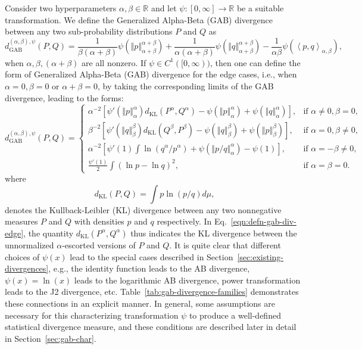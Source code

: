 \documentclass[11pt]{article}
\theoremstyle{plain}
\theoremstyle{remark}
\def\R{\mathbb{R}}
\newcommand{\dKL}{d_{\mathrm{KL}}}
\newcommand{\dGAB}{d_{\mathrm{GAB}}}
\newcommand{\norm}[1]{\left\Vert #1 \right\Vert}
\newcommand{\inner}[1]{\left\langle #1\right\rangle}
\begin{document}
Consider two hyperparameters $\alpha, \beta \in \R$ and let $\psi: [0, \infty] \rightarrow \R$ be a suitable transformation. We define the Generalized Alpha-Beta (GAB) divergence between any two sub-probability distributions $P$ and $Q$ as
\begin{equation}
    \dGAB^{(\alpha,\beta),\psi}(P, Q)
    = \dfrac{1}{\beta(\alpha+\beta)} \psi\left( \norm{p}_{\alpha+\beta}^{\alpha+\beta} \right)
    + \dfrac{1}{\alpha(\alpha+\beta)} \psi\left( \norm{q}_{\alpha+\beta}^{\alpha+\beta} \right)
    - \dfrac{1}{\alpha\beta} \psi\left( \inner{p,q}_{\alpha,\beta} \right),
    \label{eqn:defn-gab-div}
\end{equation}
\noindent when $\alpha, \beta, (\alpha+\beta)$ are all nonzero. If $\psi \in C^1([0,\infty))$, then one can define the form of Generalized Alpha-Beta (GAB) divergence for the edge cases, i.e., when $\alpha = 0, \beta = 0$ or $\alpha + \beta = 0$, by taking the corresponding limits of the GAB divergence, leading to the forms:
\begin{equation}
    \dGAB^{(\alpha,\beta),\psi}(P, Q)
    = \begin{cases}
        \alpha^{-2}\left[ \psi'(\norm{p}_{\alpha}^{\alpha}) \dKL(P^\alpha,Q^\alpha) - \psi(\norm{p}_\alpha^\alpha) + \psi(\norm{q}_\alpha^\alpha)\right], & \text{if } \alpha \neq 0, \beta = 0, \\
        \beta^{-2} \left[\psi'(\norm{q}_{\beta}^{\beta}) \dKL(Q^\beta, P^\beta) - \psi(\norm{q}_\beta^\beta) + \psi(\norm{p}_\beta^\beta)\right],         & \text{if } \alpha = 0, \beta \neq 0, \\
        \alpha^{-2}\left[ \psi'(1) \int \ln(q^\alpha/p^\alpha) + \psi\left( \norm{p/q}_\alpha^{\alpha} \right) - \psi(1) \right],                         & \text{if } \alpha = -\beta \neq 0,   \\
        \frac{\psi'(1)}{2}\int (\ln p - \ln q)^2,                                                                                                         & \text{if } \alpha = \beta = 0.
    \end{cases}
    \label{eqn:defn-gab-div-edge}
\end{equation}
\noindent where
\begin{equation}
    \dKL(P, Q) = \int p\ln \left( p/q \right) d\mu,
    \label{eqn:d-kl-1}
\end{equation}
\noindent denotes the Kullback-Leibler (KL) divergence between any two nonnegative measures $P$ and $Q$ with densities $p$ and $q$ respectively. In Eq.~\eqref{eqn:defn-gab-div-edge}, the quantity $\dKL(P^\alpha, Q^\alpha)$ thus indicates the KL divergence between the unnormalized $\alpha$-escorted versions of $P$ and $Q$. It is quite clear that different choices of $\psi(x)$ lead to the special cases described in Section~\ref{sec:existing-divergences}, e.g., the identity function leads to the AB divergence, $\psi(x) = \ln(x)$ leads to the logarithmic AB divergence, power transformation leads to the J2 divergence, etc. Table~\ref{tab:gab-divergence-families} demonstrates these connections in an explicit manner. In general, some assumptions are necessary for this characterizing transformation $\psi$ to produce a well-defined statistical divergence measure, and these conditions are described later in detail in Section~\ref{sec:gab-char}.
\end{document}
